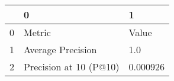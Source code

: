 \begin{tabular}{lll}
\toprule
{} &                       0 &         1 \\
\midrule
0 &                  Metric &     Value \\
1 &       Average Precision &       1.0 \\
2 &  Precision at 10 (P@10) &  0.000926 \\
\bottomrule
\end{tabular}
